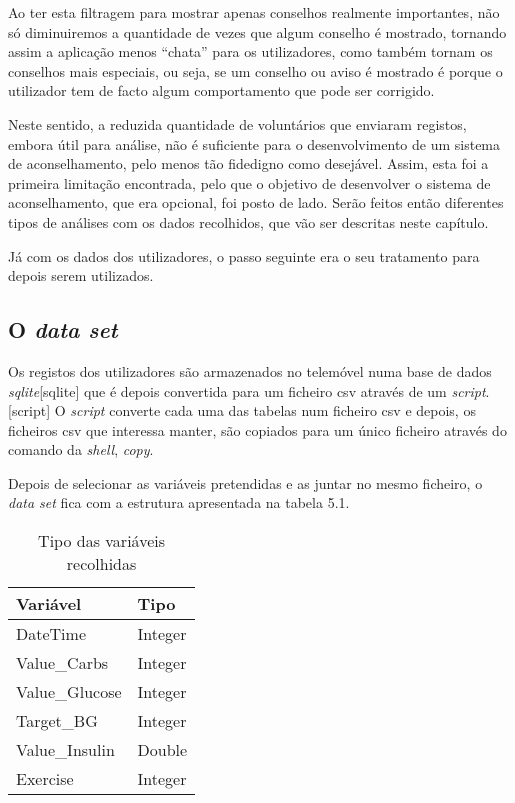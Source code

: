 Ao ter esta filtragem para mostrar apenas conselhos realmente importantes, não só diminuiremos a quantidade de vezes que algum conselho é mostrado, tornando assim a aplicação menos ``chata'' para os utilizadores, como também tornam os conselhos mais especiais, ou seja, se um conselho ou aviso é mostrado é porque o utilizador tem de facto algum comportamento que pode ser corrigido.

Neste sentido, a reduzida quantidade de voluntários que enviaram registos, embora útil para análise, não é suficiente para o desenvolvimento de um sistema de aconselhamento, pelo menos tão fidedigno como desejável. Assim, esta foi a primeira limitação encontrada, pelo que o objetivo de desenvolver o sistema de aconselhamento, que era opcional, foi posto de lado. Serão feitos então diferentes tipos de análises com os dados recolhidos, que vão ser descritas neste capítulo.

Já com os dados dos utilizadores, o passo seguinte era o seu tratamento para depois serem utilizados.


\subsection{O \textit{data set}}

Os registos dos utilizadores são armazenados no telemóvel numa base de dados \textit{sqlite}[sqlite] que é depois convertida para um ficheiro csv através de um \textit{script}.[script] O \textit{script} converte cada uma das tabelas num ficheiro csv e depois, os ficheiros csv que interessa manter, são copiados para um único ficheiro através do comando da \textit{shell}, \textit{copy}.

Depois de selecionar as variáveis pretendidas e as juntar no mesmo ficheiro, o \textit{data set} fica com a estrutura apresentada na tabela 5.1.
 

\begin{table}[H]
\centering

\label{my-label}
\begin{tabular}{|l|l|}
\hline
\rowcolor[HTML]{C0C0C0} 
{\color[HTML]{000000} \textbf{Variável}} & {\color[HTML]{000000} \textbf{Tipo}} \\ \hline
\rowcolor[HTML]{FFFFFF} 
DateTime                                 & Integer                              \\ \hline
\rowcolor[HTML]{FFFFFF} 
Value\_Carbs                             & Integer                              \\ \hline
\rowcolor[HTML]{FFFFFF} 
Value\_Glucose                           & Integer                              \\ \hline
\rowcolor[HTML]{FFFFFF} 
Target\_BG                               & Integer                              \\ \hline
\rowcolor[HTML]{FFFFFF} 
Value\_Insulin                           & Double                               \\ \hline
Exercise                                 & Integer                              \\ \hline
\end{tabular}
\caption{Tipo das variáveis recolhidas}
\end{table}

